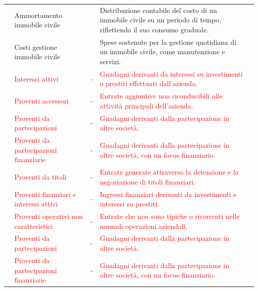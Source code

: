 \documentclass{article}
\newcommand{\AmmortamentoImmobileCivile}{Distribuzione contabile del costo di un immobile civile su un periodo di tempo, riflettendo il suo consumo graduale.}
\newcommand{\CostiGestioneImmobileCivile}{Spese sostenute per la gestione quotidiana di un immobile civile, come manutenzione e servizi.}
\newcommand{\InteressiAttivi}{Guadagni derivanti da interessi su investimenti o prestiti effettuati dall'azienda.}
\newcommand{\ProventiAccessori}{Entrate aggiuntive non riconducibili alle attività principali dell'azienda.}
\newcommand{\ProventiDaPartecipazioni}{Guadagni derivanti dalla partecipazione in altre società.}
\newcommand{\ProventiDaPartecipazioniFinanziarie}{Guadagni derivanti dalla partecipazione in altre società, con un focus finanziario.}
\newcommand{\ProventiDaTitoli}{Entrate generate attraverso la detenzione e la negoziazione di titoli finanziari.}
\newcommand{\ProventiFinanziariInteressiAttivi}{Ingressi finanziari derivanti da investimenti e interessi su prestiti.}
\newcommand{\ProventiOperativiNonCaratteristici}{Entrate che non sono tipiche o ricorrenti nelle normali operazioni aziendali.}
\begin{document}
\begin{table}[ht]
{\begin{tabular}{|c l|c|l|c|}
                           & Ammortamento immobile civile                                            &                    & \AmmortamentoImmobileCivile                                 &           \\
                           & Costi gestione immobile civile                                          &                    & \CostiGestioneImmobileCivile                                &           \\
                           & \textcolor{red}{Interessi attivi}                                       & \textcolor{red}{-} & \textcolor{red}{\InteressiAttivi}                           &           \\
                           & \textcolor{red}{Proventi accessori}                                     & \textcolor{red}{-} & \textcolor{red}{\ProventiAccessori}                         &           \\
                           & \textcolor{red}{Proventi da partecipazioni}                             & \textcolor{red}{-} & \textcolor{red}{\ProventiDaPartecipazioni}                  &           \\
                           & \textcolor{red}{Proventi da partecipazioni finanziarie}                 & \textcolor{red}{-} & \textcolor{red}{\ProventiDaPartecipazioniFinanziarie}       &           \\
                           & \textcolor{red}{Proventi da titoli}                                     & \textcolor{red}{-} & \textcolor{red}{\ProventiDaTitoli}                          &           \\
                           & \textcolor{red}{Proventi finanziari e interessi attivi}                 & \textcolor{red}{-} & \textcolor{red}{\ProventiFinanziariInteressiAttivi}         &           \\
                           & \textcolor{red}{Proventi operativi non caratteristici}                  & \textcolor{red}{-} & \textcolor{red}{\ProventiOperativiNonCaratteristici}        &           \\
                           & \textcolor{red}{Proventi da partecipazioni}                             & \textcolor{red}{-} & \textcolor{red}{\ProventiDaPartecipazioni}                  &           \\
                           & \textcolor{red}{Proventi da partecipazioni finanziarie}                 & \textcolor{red}{-} & \textcolor{red}{\ProventiDaPartecipazioniFinanziarie}       &           \\

\end{tabular}}
\end{table}
\end{document}
